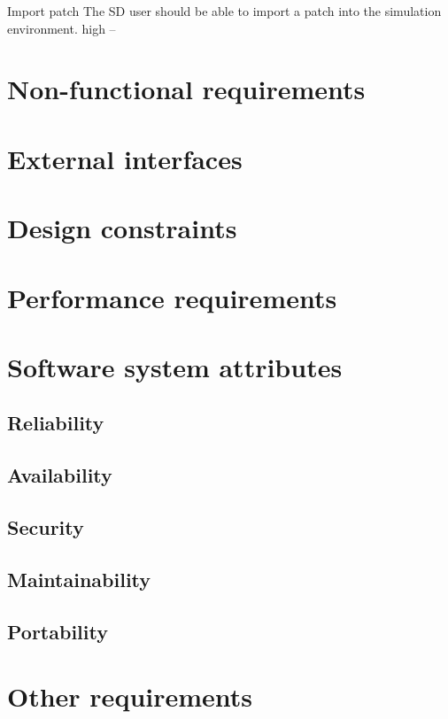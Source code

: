 	{Import patch}
	{The SD user should be able to import a patch into the simulation environment.}
	{high}
	{--}
	
	\section{Non-functional requirements}
	\section{External interfaces}
	\section{Design constraints}
	\section{Performance requirements}
	\section{Software system attributes}
		\subsection{Reliability}
		\subsection{Availability}
		\subsection{Security}
		\subsection{Maintainability}
		\subsection{Portability}
	\section{Other requirements}